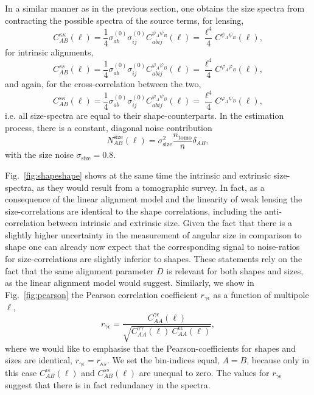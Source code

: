 \documentclass[a4paper,fleqn,usenatbib]{mnras}
\begin{document}
In a similar manner as in the previous section, one obtains the size spectra from contracting the possible spectra of the source terms, for lensing,
\begin{equation}
C^{\kappa\kappa}_{AB}(\ell) = \frac{1}{4}\sigma^{(0)}_{ab}\sigma^{(0)}_{ij}C^{\psi_A\psi_B}_{abij}(\ell) = \frac{\ell^4}{4}C^{\psi_A\psi_B}(\ell),
\end{equation}
for intrinsic alignments,
\begin{equation}
C^{ss}_{AB}(\ell) = \frac{1}{4}\sigma^{(0)}_{ab}\sigma^{(0)}_{ij}C^{\varphi_A\varphi_B}_{abij}(\ell) = \frac{\ell^4}{4}C^{\varphi_A\varphi_B}(\ell),
\end{equation}
and again, for the cross-correlation between the two,
\begin{equation}
C^{s\kappa}_{AB}(\ell) = \frac{1}{4}\sigma^{(0)}_{ab}\sigma^{(0)}_{ij}C^{\varphi_A\psi_B}_{abij}(\ell) = \frac{\ell^4}{4}C^{\varphi_A\psi_B}(\ell),
\end{equation}
i.e. all size-spectra are equal to their shape-counterparts. In the estimation process, there is a constant, diagonal noise contribution
\begin{equation}
N_{AB}^\mathrm{size}(\ell) = \sigma^2_\mathrm{size} \frac{n_\mathrm{tomo}}{\bar{n}}\delta_{AB},
\end{equation}
with the size noise $\sigma_\mathrm{size} = 0.8$.

Fig.~\ref{fig:shapeshape} shows at the same time the intrinsic and extrinsic size-spectra, as they would result from a tomographic survey. In fact, as a consequence of the linear alignment model and the linearity of weak lensing the size-correlations are identical to the shape correlations, including the anti-correlation between intrinsic and extrinsic size. Given the fact that there is a slightly higher uncertainty in the measurement of angular size in comparison to shape one can already now expect that the corresponding signal to noise-ratios for size-correlations are slightly inferior to shapes. These statements rely on the fact that the same alignment parameter $D$ is relevant for both shapes and sizes, as the linear alignment model would suggest. Similarly, we show in Fig.~\ref{fig:pearson} the Pearson correlation coefficient $r_{\gamma\epsilon}$ as a function of multipole $\ell$,
\begin{equation}
r_{\gamma\epsilon} = \frac{C^{\gamma\epsilon}_{AA}(\ell)}{\sqrt{C^{\gamma\gamma}_{AA}(\ell)\: C^{\epsilon\epsilon}_{AA}(\ell)}},
\end{equation}
where we would like to emphasise that the Pearson-coefficients for shapes and sizes are identical, $r_{\gamma\epsilon}= r_{\kappa s}$. We set the bin-indices equal, $A = B$, because only in this case $C^{\epsilon\epsilon}_{AB}(\ell)$ and $C^{ss}_{AB}(\ell)$ are unequal to zero. The values for $r_{\gamma\epsilon}$ suggest that there is in fact redundancy in the spectra.
\end{document}

